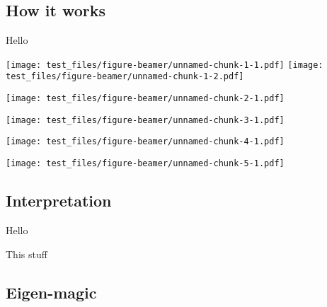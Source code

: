 \documentclass[
  ignorenonframetext,
]{beamer}
\begin{document}
\hypertarget{how-it-works}{%
\subsection{How it works}\label{how-it-works}}

\begin{frame}{Hello}
\protect\hypertarget{hello-2}{}

\texttt{[image: test\_files/figure-beamer/unnamed-chunk-1-1.pdf]}
\texttt{[image: test\_files/figure-beamer/unnamed-chunk-1-2.pdf]}

\end{frame}

\begin{frame}

\texttt{[image: test\_files/figure-beamer/unnamed-chunk-2-1.pdf]}

\end{frame}

\begin{frame}

\texttt{[image: test\_files/figure-beamer/unnamed-chunk-3-1.pdf]}

\end{frame}

\begin{frame}

\texttt{[image: test\_files/figure-beamer/unnamed-chunk-4-1.pdf]}

\end{frame}

\begin{frame}

\texttt{[image: test\_files/figure-beamer/unnamed-chunk-5-1.pdf]}

\end{frame}

\hypertarget{interpretation}{%
\subsection{Interpretation}\label{interpretation}}

\begin{frame}{Hello}
\protect\hypertarget{hello-3}{}

This stuff

\end{frame}

\hypertarget{eigen-magic}{%
\subsection{Eigen-magic}\label{eigen-magic}}
\end{document}
